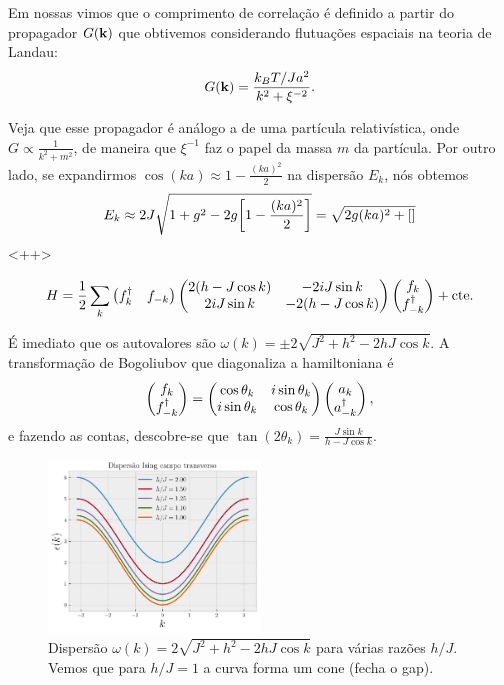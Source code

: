 \documentclass[a4paper,10pt]{article}
\begin{document}
Em nossas vimos que o comprimento de correlação é definido a partir do propagador $G(\vb{k})$ que obtivemos considerando flutuações espaciais na teoria de Landau:
$$
G(\vb{k}) = \frac{k_B T / Ja^2}{k^2 + \xi^{-2}}.
$$

Veja que esse propagador é análogo a de uma partícula relativística, onde $G \propto \frac{1}{k^2 + m^2}$, de maneira que $\xi^{-1}$ faz o papel da massa $m$ da partícula. Por outro lado, se expandirmos $\cos(ka) \approx 1 - \frac{(ka)^2}{2}$ na dispersão $E_k$, nós obtemos
$$
E_k \approx 2J \sqrt{1 + g^2 - 2g \qty[1-\frac{(ka)^2}{2}]} =
\sqrt{2g(ka)^2 + []}
$$
<++>


\n\n\n\n\n\n
$$
H =
\frac{1}{2}
\sum_{k}
\begin{pmatrix}
f_k^\dagger & f_{-k}
\end{pmatrix}
\begin{pmatrix}
2(h - J \cos k) & -2iJ \sin k \\
2iJ \sin k & -2(h - J\cos k)
\end{pmatrix}
\begin{pmatrix}
f_k \\ f_{-k}^\dagger
\end{pmatrix}
+ \text{cte}.
$$

É imediato que os autovalores são $\omega(k) = \pm 2\sqrt{J^2 + h^2 - 2hJ \cos k}$. A transformação de Bogoliubov que diagonaliza a hamiltoniana é
$$
\begin{pmatrix}
f_k \\ f_{-k}^\dagger
\end{pmatrix}
=
\begin{pmatrix}
 \cos \theta_k & i\sin \theta_k  \\
i\sin \theta_k &  \cos \theta_k
\end{pmatrix}
\begin{pmatrix}
a_k \\ a_{-k}^\dagger
\end{pmatrix},
$$
e fazendo as contas, descobre-se que $\tan(2\theta_k) = \frac{J \sin k}{h - J \cos k}$.

\begin{figure}[H]
\centering
\includegraphics[width=0.5\textwidth]{fig/transv_ising.png}
\caption{Dispersão $\omega(k) = 2\sqrt{J^2 + h^2 - 2hJ \cos k}$ para várias razões $h/J$. Vemos que para $h/J = 1$ a curva forma um cone (fecha o gap).}
\label{fig:transv_ising}
\end{figure}
\end{document}
